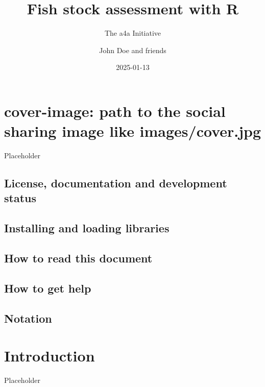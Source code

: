 \documentclass[
]{book}
\title{Fish stock assessment with R}
\subtitle{The a4a Initiative}
\author{John Doe and friends}
\date{2025-01-13}
\begin{document}
\maketitle

{
\setcounter{tocdepth}{1}
\tableofcontents
}
\hypertarget{cover-image-path-to-the-social-sharing-image-like-imagescover.jpg}{%
\chapter{cover-image: path to the social sharing image like images/cover.jpg}\label{cover-image-path-to-the-social-sharing-image-like-imagescover.jpg}}

Placeholder

\hypertarget{license-documentation-and-development-status}{%
\section{License, documentation and development status}\label{license-documentation-and-development-status}}

\hypertarget{installing-and-loading-libraries}{%
\section{Installing and loading libraries}\label{installing-and-loading-libraries}}

\hypertarget{how-to-read-this-document}{%
\section{How to read this document}\label{how-to-read-this-document}}

\hypertarget{how-to-get-help}{%
\section{How to get help}\label{how-to-get-help}}

\hypertarget{notation}{%
\section{Notation}\label{notation}}

\hypertarget{introduction}{%
\chapter{Introduction}\label{introduction}}

Placeholder
\end{document}
